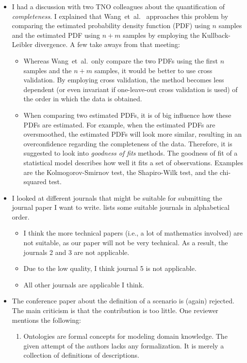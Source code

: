 \documentclass[10pt,final,a4paper,oneside,onecolumn]{article}
\begin{document}
\begin{itemize}
	\item I had a discussion with two TNO colleagues about the quantification of \emph{completeness}. I explained that Wang~et~al.\ \cite{wang2017much} approaches this problem by comparing the estimated probability density function (PDF) using $n$ samples and the estimated PDF using $n+m$ samples by employing the Kullback-Leibler divergence. A few take aways from that meeting:
	\begin{itemize}
		\item Whereas Wang~et~al.\ only compare the two PDFs using the first $n$ samples and the $n+m$ samples, it would be better to use cross validation. By employing cross validation, the method becomes less dependent (or even invariant if one-leave-out cross validation is used) of the order in which the data is obtained. 
		\item When comparing two estimated PDFs, it is of big influence how these PDFs are estimated. For example, when the estimated PDFs are oversmoothed, the estimated PDFs will look more similar, resulting in an overconfidence regarding the completeness of the data. Therefore, it is suggested to look into \emph{goodness of fits} methods. The goodness of fit of a statistical model describes how well it fits a set of observations. Examples are the Kolmogorov-Smirnov test, the Shapiro-Wilk test, and the chi-squared test.
	\end{itemize}
	\item I looked at different journals that might be suitable for submitting the journal paper I want to write.  lists some suitable journals in alphabetical order.
	\begin{itemize}
		\item I think the more technical papers (i.e., a lot of mathematics involved) are not suitable, as our paper will not be very technical. As a result, the journals 2 and 3 are not applicable.
		\item Due to the low quality, I think journal 5 is not applicable.
		\item All other journals are applicable I think. 
	\end{itemize}
	\item The conference paper about the definition of a scenario is (again) rejected. The main criticism is that the contribution is too little. One reviewer mentions the following:
	\begin{enumerate}
		\item Ontologies are formal concepts for modeling domain knowledge. The given attempt of the authors lacks any formalization. It is merely a collection of definitions of descriptions.

\end{enumerate}
\end{itemize}
\end{document}
